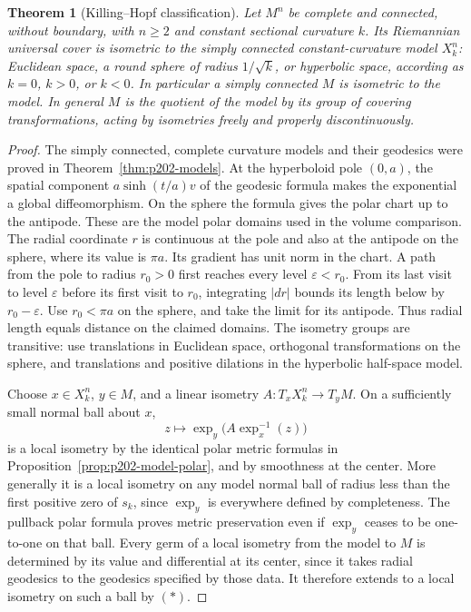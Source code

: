 \documentclass[11pt,oneside,openany]{book}
\theoremstyle{plain}
\newtheorem{theorem}{Theorem}[chapter]
\theoremstyle{definition}
\theoremstyle{remark}
\begin{document}
\begin{theorem}[Killing--Hopf classification]\label{thm:p202-killing-hopf}
Let \(M^n\) be complete and connected, without boundary, with
\(n\ge2\) and constant sectional curvature \(k\).
Its Riemannian universal cover is isometric to the simply
connected constant-curvature model \(X_k^n\): Euclidean
space, a round sphere of radius \(1/\sqrt{k}\), or hyperbolic
space, according as \(k=0\), \(k>0\), or \(k<0\).
In particular a simply connected \(M\) is isometric to the
model. In general \(M\) is the quotient of the model by its
group of covering transformations, acting by isometries
freely and properly discontinuously.
\end{theorem}

\begin{proof}
The simply connected, complete curvature models and their
geodesics were proved in Theorem~\ref{thm:p202-models}.
At the hyperboloid pole \((0,a)\), the spatial component
\(a\sinh(t/a)v\) of the geodesic formula makes the
exponential a global diffeomorphism. On the sphere the
formula gives the polar chart up to the antipode.
These are the model polar domains used in the volume
comparison. The radial coordinate \(r\) is continuous
at the pole and also at the antipode on the sphere,
where its value is \(\pi a\). Its gradient has unit norm
in the chart. A path from the pole to radius \(r_0>0\)
first reaches every level \(\varepsilon<r_0\). From its
last visit to level \(\varepsilon\) before its first visit
to \(r_0\), integrating \(|dr|\) bounds its length below
by \(r_0-\varepsilon\). Use \(r_0<\pi a\) on the sphere,
and take the limit for its antipode. Thus radial length
equals distance on the claimed domains. The isometry
groups are transitive: use translations in Euclidean
space, orthogonal transformations on the sphere, and
translations and positive dilations in the hyperbolic
half-space model.

Choose \(x\in X_k^n\), \(y\in M\), and a linear isometry
\(A:T_xX_k^n\to T_yM\). On a sufficiently small normal ball
about \(x\),
\[
 z\longmapsto\exp_y\big(A\exp_x^{-1}(z)\big)
 \tag{*}
\]
is a local isometry by the identical polar metric formulas
in Proposition~\ref{prop:p202-model-polar}, and by smoothness
at the center. More generally it is a local isometry on any
model normal ball of radius less than the first positive
zero of \(s_k\), since \(\exp_y\) is everywhere defined by
completeness. The pullback polar formula proves metric
preservation even if \(\exp_y\) ceases to be one-to-one on
that ball. Every germ of a local isometry from the model to
\(M\) is determined by its value and differential at its
center, since it takes radial geodesics to the geodesics
specified by those data. It therefore extends to a local
isometry on such a ball by \((*)\).


\end{proof}
\end{document}
